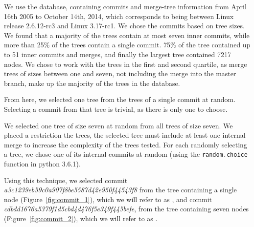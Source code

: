  We use the \tool database, containing commits and merge-tree
information from April 16th 2005 to October 14th, 2014, which
corresponds to being between Linux release 2.6.12-rc3 and Linux
3.17-rc1.  
We chose the commits based on tree sizes. We 
 found that a majority of the trees
contain at most seven inner commits, while more than 25\% of the trees
contain a single commit. 75\% of the tree contained up to 51 inner
commits and merges, and finally the largest tree contained 7217 nodes.
We chose to work with the trees in  the first
and second quartile, as merge trees of sizes between one and seven, not
including the merge into the master branch, make up the majority of the
trees in the database.

 From
here, we selected one tree from the trees of a single commit at random.
Selecting a commit from that tree is trivial, as there is only one to
choose.

We selected one tree of size seven at random from all trees of size
seven. We placed a restriction the trees, the
selected tree must include at least one internal merge to increase the
complexity of the trees tested. For each randomly selecting a tree, we
chose one of its internal commits at random (using the
\verb|random.choice| function in python 3.6.1).


Using this technique, we selected commit
\emph{a3c1239eb59c0a907f8be5587d42e950f44543f8} from the tree containing
a single node (Figure~\ref{fig:commit_1}), which we will refer to as
\comA, and commit \emph{cdbdd1676a5379f1d5cbd4d476f5e349f445befe}, from
the tree containing seven nodes (Figure~\ref{fig:commit_2}), which we
will refer to as \comB.

